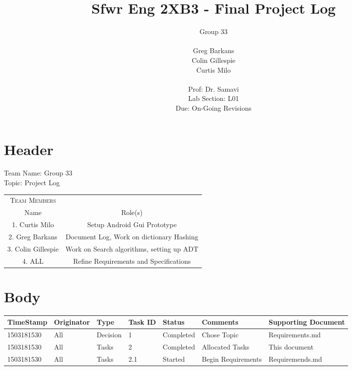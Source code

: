 \documentclass[10pt, oneside]{article}
\title{Sfwr Eng 2XB3 - Final Project Log}
\author{
	Group 33   \\ \\ 
	Greg Barkans \\
	Colin Gillespie \\
	Curtis Milo \\
	 \vspace{2cm} \\
	Prof: Dr. Samavi \\
	Lab Section: L01 \\
	Due: On-Going Revisions \\	
}
\date{}
\begin{document}
\maketitle
\newpage


\section{Header}
Team Name: Group 33 \\
Topic: Project Log

\vspace{1cm}

\begin{tabular}{c|c}

	\textsc{Team Members} & \\
	Name & Role(s) \\
	\hline
	1. Curtis Milo & Setup Android Gui Prototype \\
	2. Greg Barkans & Document Log, Work on dictionary Hashing \\
	3. Colin Gillespie & Work on Search algorithms, setting up ADT \\
	4. ALL & Refine Requirements and Specifications 
\end{tabular}



\section{Body}

\setlength{\tabcolsep}{5pt}
\begin{tabular}{p{2cm}|p{1.75cm}|p{1.25cm}|p{1cm}|p{2cm}|p{3cm}|p{2cm}}

	\hline
	TimeStamp & Originator & Type & Task ID & Status & Comments & Supporting Document \\
	\hline
	1503181530 & All & Decision & 1 & Completed & Chose Topic & Requirements.md \\
	\hline
	1503181530 & All & Tasks & 2 & Completed & Allocated Tasks & This document \\
	\hline
	1503181530 & All & Tasks & 2.1 & Started & Begin Requirements & Requiremends.md
\end{tabular}
\end{document}
